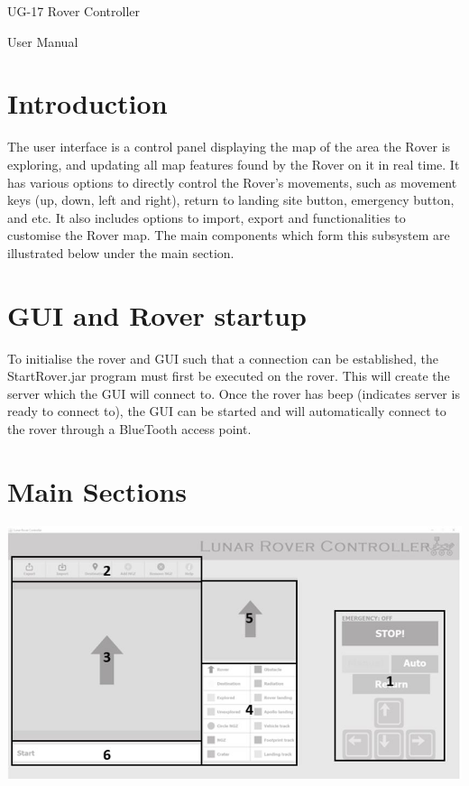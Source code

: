 \documentclass[12pt]{article}
\begin{document}
	\begin{titlepage}		%

		{\Huge UG-17 Rover Controller}

		\vspace{0.5cm}

		{\Huge User Manual}


	\end{titlepage}

	\clearpage


	\tableofcontents
	\clearpage


	

	\section{Introduction}
The user interface is a control panel displaying the map of the area the Rover is exploring, and updating all map features found by the Rover on it in real time. It has various options to directly control the Rover’s movements, such as movement keys (up, down, left and right), return to landing site button, emergency button, and etc. It also includes options to import, export and functionalities to customise the Rover map. The main components which form this subsystem are illustrated below under the main section.
	
	\section{GUI and Rover startup}
To initialise the rover and GUI such that a connection can be established, the StartRover.jar program must first be executed on the rover. This will create the server which the GUI will connect to. Once the rover has beep (indicates server is ready to connect to), the GUI can be started and will automatically connect to the rover through a BlueTooth access point. 
	
	\section{Main Sections}
		\begin{center}
		\includegraphics[scale=1]{RoverController.jpg}
		\end{center}		
\end{document}
